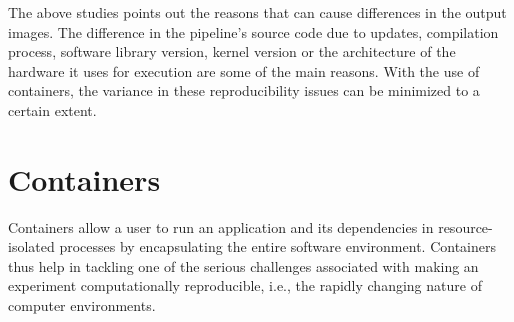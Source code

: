 The above studies points out the reasons that can cause differences in the output images. The difference in the pipeline's source code due to updates, compilation process, software library version, kernel version or the architecture of the hardware it uses for execution are some of the main reasons. With the use of containers, the variance in these reproducibility issues can be minimized to a certain extent. 

\section{Containers}
Containers allow a user to run an application and its dependencies in resource-isolated processes by encapsulating the entire software environment. Containers thus help in tackling one of the serious challenges associated with making an experiment computationally reproducible, i.e., the rapidly changing nature of computer environments. 


